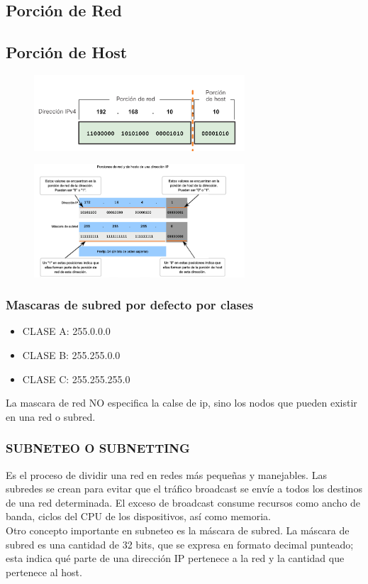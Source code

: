 \documentclass[letterpaper,12pt]{article}
\begin{document}
\begin{sloppypar}
\subsection{Porción de Red}
\subsection{Porción de Host}

\begin{figure}[H]
    \centering 
    \includegraphics[width=0.7\textwidth]{redesss2.png}
\end{figure}
\begin{figure}[H]
    \centering 
    \includegraphics[width=0.7\textwidth]{redes3.png}
\end{figure}

\subsubsection{Mascaras de subred por defecto por clases}
\begin{itemize}
    \item CLASE A: 255.0.0.0
    \item CLASE B: 255.255.0.0
    \item CLASE C: 255.255.255.0
\end{itemize}
La mascara de red NO especifica la calse de ip, sino los nodos que pueden existir en una red o subred.

\subsubsection{SUBNETEO O SUBNETTING}
Es el proceso de dividir una red en redes más pequeñas y manejables. Las subredes se crean para evitar que el tráfico broadcast se envíe a todos los destinos de una red determinada. El exceso de broadcast consume recursos como ancho de banda, ciclos del CPU de los dispositivos, así como memoria.
\vspace{0.3cm}\\ 
Otro concepto importante en subneteo es la máscara de subred. La máscara de subred es una cantidad de 32 bits, que se expresa en formato decimal punteado; esta indica qué parte de una dirección IP pertenece a la red y la cantidad que pertenece al host.


\end{sloppypar}
\end{document}
